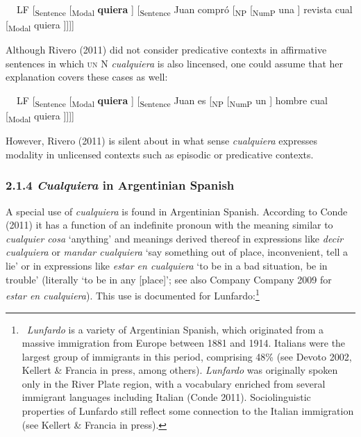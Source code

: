\begin{styleStandard}
\textbf{\ \ }LF [\textsubscript{Sentence} [\textsubscript{Modal} \textbf{quiera} ] [\textsubscript{Sentence} Juan compró [\textsubscript{NP} [\textsubscript{NumP} una ] revista cual [\textsubscript{Modal} quiera ]]]]
\end{styleStandard}

\begin{styleStandard}
Although Rivero (2011) did not consider predicative contexts in affirmative sentences in which \textsc{un} N \textit{cualquiera} is also lincensed, one could assume that her explanation covers these cases as well:
\end{styleStandard}

\begin{styleStandard}
\textbf{\ \ }LF [\textsubscript{Sentence} [\textsubscript{Modal} \textbf{quiera} ] [\textsubscript{Sentence} Juan es [\textsubscript{NP} [\textsubscript{NumP} un ] hombre cual [\textsubscript{Modal} quiera ]]]]
\end{styleStandard}

\begin{styleStandard}
However, Rivero (2011) is silent about in what sense \textit{cualquiera} expresses modality in unlicensed contexts such as episodic or predicative contexts.
\end{styleStandard}

\subsubsection[2.1.4 Cualquiera in Argentinian Spanish]{\textbf{2.1.4 }\textbf{\textit{Cualquiera}}\textbf{ in Argentinian Spanish}}
\begin{styleStandard}
A special use of \textit{cualquiera} is found in Argentinian Spanish. According to Conde (2011) it has a function of an indefinite pronoun with the meaning similar to \textit{cualquier cosa} ‘anything’ and meanings derived thereof in expressions like \textit{decir cualquiera} or \textit{mandar cualquiera} ‘say something out of place, inconvenient, tell a lie’ or in expressions like \textit{estar en cualquiera} ‘to be in a bad situation, be in trouble’ (literally ‘to be in any [place]’; see also Company Company 2009 for \textit{estar en cualquiera}). This use is documented for Lunfardo:\footnote{\textrm{\ }\textrm{\textit{Lunfardo}}\textrm{ is a variety of Argentinian Spanish, which originated from a massive immigration from Europe between 1881 and 1914. Italians were the largest group of immigrants in this period, comprising 48\% (see Devoto 2002, Kellert \& Francia in press, among others). }\textrm{\textit{Lunfardo}}\textrm{ was originally spoken only in the River Plate region, with a vocabulary enriched from several immigrant languages including Italian (Conde 2011). Sociolinguistic properties of Lunfardo still reflect some connection to the Italian immigration (see Kellert \& Francia in press).}}
\end{styleStandard}

